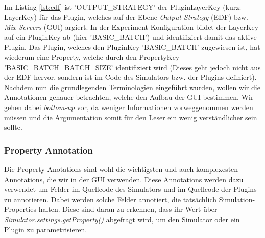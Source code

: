 \documentclass[a4paper, 11pt]{article} %
\begin{document}
Im Listing \ref{lst:edf} ist 'OUTPUT\_STRATEGY' der PluginLayerKey (kurz: LayerKey) für das Plugin, welches auf der Ebene \emph{Output Strategy} (EDF) bzw.  \emph{Mix-Servers} (GUI) argiert. In der Experiment-Konfiguration bildet der LayerKey auf ein PluginKey ab (hier 'BASIC\_BATCH') und identifiziert damit das aktive Plugin. Das Plugin, welches den PluginKey 'BASIC\_BATCH' zugewiesen ist, hat wiederum eine Property, welche durch den PropertyKey 'BASIC\_BATCH\_BATCH\_SIZE' identifiziert wird (Dieses geht jedoch nicht aus der EDF hervor, sondern ist im Code des Simulators bzw. der Plugins definiert).\\

Nachdem nun die grundlegenden Terminologien eingeführt wurden, wollen wir die Annotationen genauer betrachten, welche den Aufbau der GUI bestimmen. Wir gehen dabei \emph{bottom-up} vor, da weniger Informationen vorweggenommen werden müssen und die Argumentation somit für den Leser ein wenig verständlicher sein sollte.

\subsubsection{Property Annotation} %
\label{ssub:feld_annotation}
Die Property-Anotations sind wohl die wichtigsten und auch komplexesten Annotations, die wir in der GUI verwenden. Diese Annotations werden dazu verwendet um Felder im Quellcode des Simulators und im Quellcode der Plugins zu annotieren. Dabei werden solche Felder annotiert, die tatsächlich Simulation-Properties halten. Diese sind daran zu erkennen, dass ihr Wert über \emph{Simulator.settings.getProperty()} abgefragt wird, um den Simulator oder ein Plugin zu parametrisieren.\\
\end{document}
